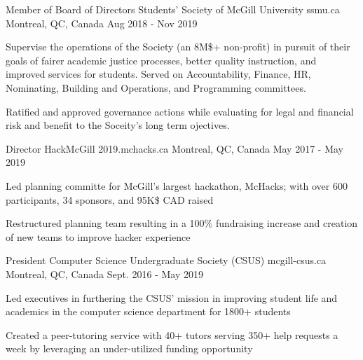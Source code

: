 

\begin{cventries}

  \cventry
    {Member of Board of Directors} %
    {Students' Society of McGill University} %
    {ssmu.ca} %
    {Montreal, QC, Canada} %
    {Aug 2018 - Nov 2019} %
    {
      \begin{cvitems} %
        \item {Supervise the operations of the Society (an 8M\$+ non-profit) in pursuit of their goals of fairer academic justice processes, better quality instruction, and improved services for students. Served on Accountability, Finance, HR, Nominating, Building and Operations, and Programming committees.}
        \item {Ratified and approved governance actions while evaluating for legal and financial risk and benefit to the Soceity's long term ojectives.}
      \end{cvitems}
    }

  \cventry
    {Director} %
    {HackMcGill} %
    {2019.mchacks.ca} %
    {Montreal, QC, Canada} %
    {May 2017 - May 2019} %
    {
      \begin{cvitems} %
        \item {Led planning committe for McGill's largest hackathon, McHacks; with over 600 participants, 34 sponsors, and 95K\$ CAD raised }
        \item {Restructured planning team resulting in a 100\% fundraising increase and creation of new teams to improve hacker experience}
      \end{cvitems}
    }

  \cventry
    {President} %
    {Computer Science Undergraduate Society (CSUS)} %
    {mcgill-csus.ca} %
    {Montreal, QC, Canada} %
    {Sept. 2016 - May 2019} %
    {
      \begin{cvitems} %
        \item {Led executives in furthering the CSUS' mission in improving student life and academics in the computer science department for 1800+ students}
        \item {Created a peer-tutoring service with 40+ tutors serving 350+ help requests a week by leveraging an under-utilized funding opportunity}
      \end{cvitems}
    }
    
    
\end{cventries}
